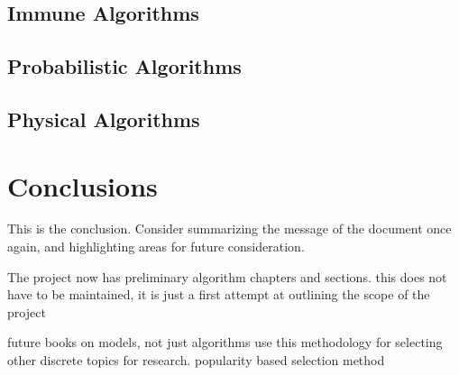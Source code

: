 \documentclass[a4paper, 11pt]{article}
\begin{document}
\subsection{Immune Algorithms}

\subsection{Probabilistic Algorithms}

\subsection{Physical Algorithms}


\section{Conclusions}
\label{sec:conclusions}
This is the conclusion. Consider summarizing the message of the document once again, and highlighting areas for future consideration.

The project now has preliminary algorithm chapters and sections.
this does not have to be maintained, it is just a first attempt at outlining the scope of the project

future books on models, not just algorithms
use this methodology for selecting other discrete topics for research. popularity based selection method



\end{document}
